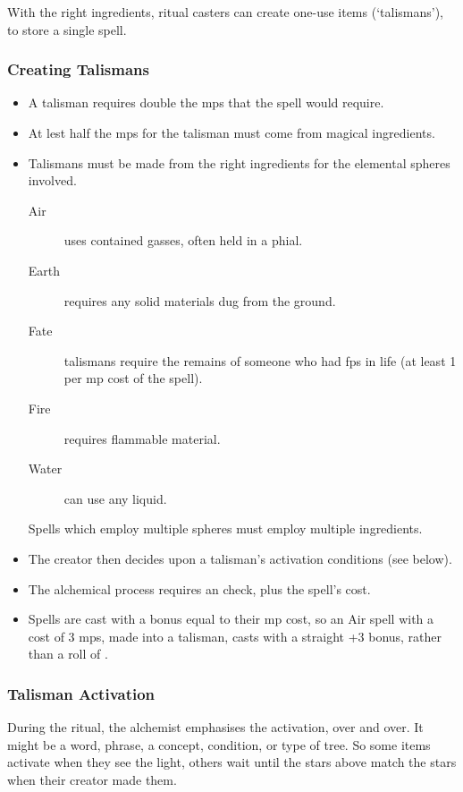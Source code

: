 \begin{multicols}{2}

\noindent
With the right ingredients, ritual casters
can create one-use items (`talismans'), to store a single spell.

\subsubsection{Creating Talismans}

\begin{itemize}
  \item
  A talisman requires double the \glspl{mp} that the spell would require.
  \item
  At lest half the \glspl{mp} for the talisman must come from magical ingredients.
  \item
  Talismans must be made from the right ingredients for the elemental spheres involved.
  \begin{description}
    \item[Air]
    uses contained gasses, often held in a phial.
    \item[Earth]
    requires any solid materials dug from the ground.
    \item[Fate]
    talismans require the remains of someone who had \glspl{fp} in life (at least 1 per \gls{mp} cost of the spell).
    \item[Fire]
    requires flammable material.
    \item[Water]
    can use any liquid.
  \end{description}
  Spells which employ multiple spheres must employ multiple ingredients.
  \item
  The creator then decides upon a talisman's activation conditions (see below).
  \item
  The alchemical process requires an  check, \tn[7] plus the spell's cost.
  \item
  Spells are cast with a bonus equal to their \gls{mp} cost, so an Air spell with a cost of 3 \glspl{mp}, made into a talisman, casts with a straight +3 bonus, rather than a roll of .
\end{itemize}

\subsubsection{Talisman Activation}

During the ritual, the alchemist emphasises the activation, over and over.
It might be a word, phrase, a concept, condition, or type of tree.
So some items activate when they see the light, others wait until the stars above match the stars when their creator made them.


\end{multicols}
